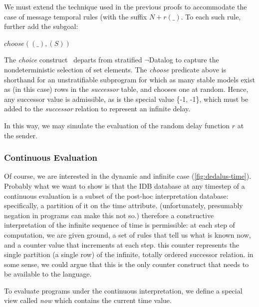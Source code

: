 We must extend the technique used in the previous proofs to accommodate the case of message temporal rules (with the suffix $N+r(\_)$.
To each such rule, further add the subgoal:

$choose((\_), (S))$

The \emph{choice} construct~\cite{eventchoice, greedychoice} departs from stratified $\lnot$Datalog to capture the nondeterministic selection
of set elements.  The \emph{choose} predicate above is shorthand for an unstratifiable subprogram for which as many stable models
exist as (in this case) rows in the \emph{successor} table, and chooses one at random.  Hence, any successor value is admissible, as is the
special value \{-1, -1\}, which must be added to the \emph{successor} relation to represent an infinite delay.

In this way, we may simulate the evaluation of the random delay function $r$ at the sender.




\subsubsection{Continuous Evaluation}



Of course, we are interested in the dynamic and infinite case (\ref{fig:dedalus-time}).
Probably what we want to show is that the IDB database at any timestep of a continuous evaluation is a subset
of the post-hoc interpretation database: specifically, a partition of it on the time attribute.  (unfortunately, presumably
negation in programs can make this not so.)  therefore a constructive interpretation of the infinite sequence of time is permissible:
at each step of computation, we are given ground, a set of rules that tell us what is known now, and a counter value that increments
at each step.  this counter represents the single partition (a single row) of the infinite, totally ordered successor relation.
in some sense, we could argue that this is the only counter construct that needs to be available to the language.


To evaluate programs under the continuous interpretation, we define a special view called \emph{now} which contains the current 
time value.


